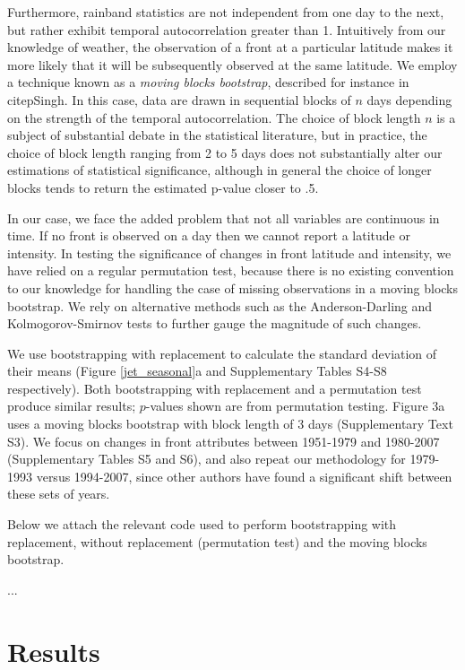 	Furthermore, rainband statistics are not independent from one day to the next, but rather exhibit temporal autocorrelation greater than 1. Intuitively from our knowledge of weather, the observation of a front at a particular latitude makes it more likely that it will be subsequently observed at the same latitude. We employ a technique known as a \textit{moving blocks bootstrap}, described for instance in citep{Singh}. In this case, data are drawn in sequential blocks of $n$ days depending on the strength of the temporal autocorrelation. The choice of block length $n$ is a subject of substantial debate in the statistical literature, but in practice, the choice of block length ranging from 2 to 5 days does not substantially alter our estimations of statistical significance, although in general the choice of longer blocks tends to return the estimated p-value closer to .5.
	
	In our case, we face the added problem that not all variables are continuous in time. If no front is observed on a day then we cannot report a latitude or intensity. In testing the significance of changes in front latitude and intensity, we have relied on a regular permutation test, because there is no existing convention to our knowledge for handling the case of missing observations in a moving blocks bootstrap. We rely on alternative methods such as the Anderson-Darling and Kolmogorov-Smirnov tests to further gauge the magnitude of such changes.
	
	We use bootstrapping with replacement to calculate the standard deviation of their means (Figure \ref{jet_seasonal}a and Supplementary Tables S4-S8 respectively). Both bootstrapping with replacement and a permutation test produce similar results; $p$-values shown are from permutation testing. Figure 3a uses a moving blocks bootstrap with block length of 3 days (Supplementary Text S3). We focus on changes in front attributes between 1951-1979 and 1980-2007 (Supplementary Tables S5 and S6), and also repeat our methodology for 1979-1993 versus 1994-2007, since other authors have found a significant shift between these sets of years.

	Below we attach the relevant code used to perform bootstrapping with replacement, without replacement (permutation test) and the moving blocks bootstrap.

...%



\section{Results}

